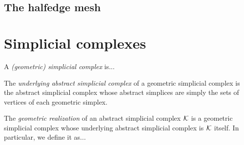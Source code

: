 \subsection{The halfedge mesh}
\label{ssec:halfedge_mesh}



\section{Simplicial complexes}
\label{sec:simplicial_complex}

\begin{definition}\label{def:simplicial_complex} %
    \leanok
    A \emph{(geometric) simplicial complex} is... 
\end{definition}

\begin{definition}\label{def:underlying_asc}
    The \emph{underlying abstract simplicial complex} of a geometric simplicial complex is the abstract simplicial complex whose abstract simplices are simply the sets of vertices of each geometric simplex.
\end{definition}

\begin{definition}\label{def:geometric_realization}
    The \emph{geometric realization} of an abstract simplicial complex $\mathcal{K}$ is a geometric simplicial complex whose underlying abstract simplicial complex is $\mathcal{K}$ itself. In particular, we define it as...
\end{definition}